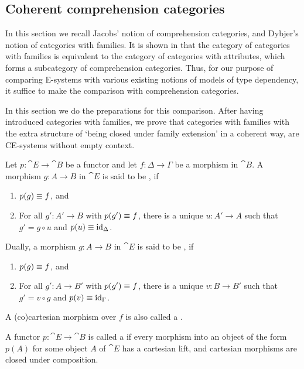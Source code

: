 \subsection{Coherent comprehension categories}
In this section we recall Jacobs' notion of comprehension categories, and 
Dybjer's notion of categories with families. It is shown in 
\cite{Hofmann_syntax_semantics} that the category of categories with families
is equivalent to the category of categories with attributes, which forms a
subcategory of comprehension categories. Thus, for our purpose of comparing
E-systems with various existing notions of models of type dependency, it suffice
to make the comparison with comprehension categories.

In this section we do the preparations for this comparison. After having
introduced categories with families, we prove that categories with families
with the extra structure of `being closed under family extension' in a coherent
way, are CE-systems without empty context. 

\begin{defn}
Let $p:\cat{E}\to\cat{B}$ be a functor and let $f:\Delta\to \Gamma$ be a morphism in $\cat{B}$.
A morphism $g:A\to B$ in $\cat{E}$ is said to be , if
\begin{enumerate}
\item $p(g)\equiv f$, and 
\item For all $g':A'\to B$ with $p(g')\equiv f$, there is a unique $u:A'\to A$
such that $g'=g\circ u$ and $p(u)\equiv{\mathrm{id}_{\Delta}}$. 
\end{enumerate}
Dually, a morphism $g:A\to B$ in $\cat{E}$ is said to be , if
\begin{enumerate}
\item $p(g)\equiv f$, and
\item For all $g':A\to B'$ with $p(g')\equiv f$, there is a unique $v:B\to B'$
such that $g'=v\circ g$ and $p(v)\equiv{\mathrm{id}_{\Gamma}}$. 
\end{enumerate}
A (co)cartesian morphism over $f$ is also called a .
\end{defn}

\begin{defn}
A functor $p:\cat{E}\to\cat{B}$ is called a  if
every morphism into an object of the form $p(A)$ for some object $A$ of $\cat{E}$ 
has a cartesian lift, and cartesian morphisms are closed under composition.
\end{defn}

